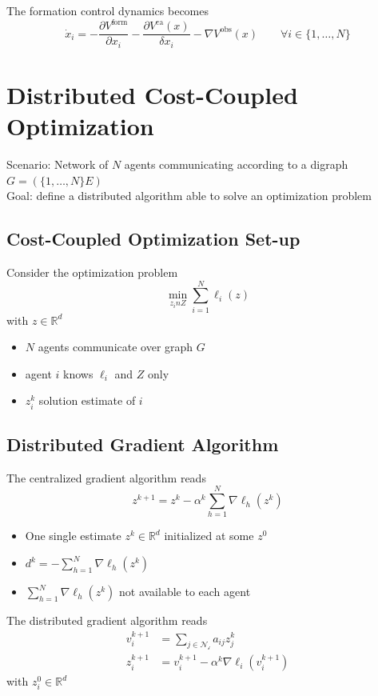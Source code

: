 \documentclass{book}
\newcommand{\R}{\mathbb{R}}
\theoremstyle{theoremv2}
\theoremstyle{defv2}
\theoremstyle{remark}
\theoremstyle{remark}
\theoremstyle{definition}
\theoremstyle{definition}
\begin{document}
The formation control dynamics becomes 
\[
    \dot{x}_i = - \displaystyle\frac{\partial V^\text{form}}{\partial x_i} - \displaystyle\frac{\partial V^\text{ca}(x)}{\delta x_i} - \nabla V^\text{obs}(x) \qquad \forall i\in\{1,\dots,N\}
\]

\chapter{Distributed Cost-Coupled Optimization}
Scenario: Network of $N$ agents communicating according to a digraph $G=(\{1,\dots,N\}E)$
\\Goal: define a distributed algorithm able to solve an optimization problem
\section{Cost-Coupled Optimization Set-up}
Consider the optimization problem 
\[
    \min_{z_in Z} \displaystyle\sum_{i=1}^{N}\ell_i(z)
\]
with $z\in\R^d$ 
\begin{itemize}
    \item $N$ agents communicate over graph $G$
    \item agent $i$ knows $\ell_i$ and $Z$ only 
    \item $z_i^k$ solution estimate of $i$
\end{itemize}
\section{Distributed Gradient Algorithm}
The centralized gradient algorithm reads 
\[
    z^{k+1} = z^k - \alpha^k \displaystyle\sum_{h=1}^{N} \nabla \ell_h(z^k)
\]
\begin{itemize}
    \item One single estimate $z^k\in\R^d$ initialized at some $z^0$ 
    \item $d^k = -\displaystyle\sum_{h=1}^{N}\nabla \ell_h(z^k)$
    \item $\displaystyle\sum_{h=1}^{N}\nabla \ell_h(z^k)$ not available to each agent
\end{itemize}
The distributed gradient algorithm reads
\begin{align*}
    v_i^{k+1} &= \displaystyle\sum_{j\in\mathcal{N_i}}a_{ij} z_j^k \\
    z_i^{k+1} &= v_i^{k+1} - \alpha^k \nabla\ell_i(v_i^{k+1})
\end{align*} 
with $z_i^0\in\R^d$
\end{document}
